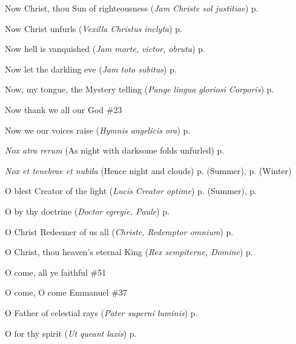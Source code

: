 \begin{hangparas}{1.25em}{1}
\par\noindent
Now Christ, thou Sun of righteousness (\textit{Jam Christe sol justitiae}) \dotfill p. \pageref{FirstLentMattins}
\par\noindent
Now Christ unfurls (\textit{Vexilla Christus inclyta}) \dotfill p. \pageref{ChristTheKingMattins}
\par\noindent
Now hell is vanquished (\textit{Jam morte, victor, obruta}) \dotfill p. \pageref{HolyRosaryMattins}
\par\noindent
Now let the darkling eve (\textit{Jam toto subitus}) \dotfill p. \pageref{SevenSorrowsEvensong}
\par\noindent
Now, my tongue, the Mystery telling (\textit{Pange lingua gloriosi Corporis}) \dotfill p. \pageref{CorpusChristiEvensong}
\par\noindent
Now thank we all our God \dotfill \#23
\par\noindent
Now we our voices raise (\textit{Hymnis angelicis ora}) \dotfill p. \pageref{ScholasticaInvitatory}
\par\noindent
\textit{Nox atra rerum} (As night with darksome folds unfurled) \dotfill p. \pageref{ThursdayInvitatory}
\par\noindent
\textit{Nox et tenebrae et nubila} (Hence night and clouds) \dotfill p. \pageref{WednesdayMattinsSummer} (Summer), p. \pageref{WednesdayMattinsWinter} (Winter)
\par\noindent
O blest Creator of the light (\textit{Lucis Creator optime}) \dotfill p. \pageref{SundayEvensongSummer} (Summer), p. \pageref{SundayEvensongWinter}
\par\noindent
O by thy doctrine (\textit{Doctor egregie, Paule}) \dotfill p. \pageref{PaulEvensong}
\par\noindent
O Christ Redeemer of us all (\textit{Christe, Redemptor omnium}) \dotfill p. \pageref{AllHallowsEvensong}
\par\noindent
O Christ, thou heaven's eternal King (\textit{Rex sempiterne, Domine}) \dotfill p. \pageref{EasterInvitatory}
\par\noindent
O come, all ye faithful \dotfill \#51
\par\noindent
O come, O come Emmanuel \dotfill \#37
\par\noindent
O Father of celestial rays (\textit{Pater superni luminis}) \dotfill p. \pageref{MaryMagdaleneEvensong}
\par\noindent
O for thy spirit (\textit{Ut queant laxis}) \dotfill p. \pageref{JohnBaptistEvensong}
\par\noindent

\end{hangparas}
